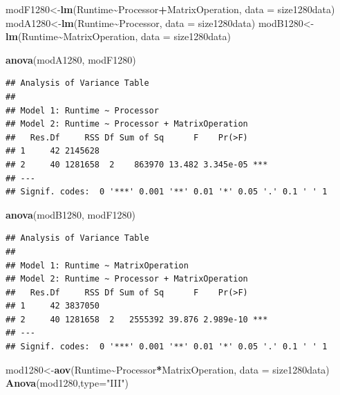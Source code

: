 \documentclass[
]{article}
\newenvironment{Shaded}{\begin{snugshade}}{\end{snugshade}}
\newcommand{\DataTypeTok}[1]{\textcolor[rgb]{0.13,0.29,0.53}{#1}}
\newcommand{\KeywordTok}[1]{\textcolor[rgb]{0.13,0.29,0.53}{\textbf{#1}}}
\newcommand{\NormalTok}[1]{#1}
\newcommand{\OperatorTok}[1]{\textcolor[rgb]{0.81,0.36,0.00}{\textbf{#1}}}
\newcommand{\StringTok}[1]{\textcolor[rgb]{0.31,0.60,0.02}{#1}}
\begin{document}
\begin{Shaded}
\begin{Highlighting}[]
\NormalTok{modF1280\textless{}{-}}\KeywordTok{lm}\NormalTok{(Runtime}\OperatorTok{\textasciitilde{}}\NormalTok{Processor}\OperatorTok{+}\NormalTok{MatrixOperation, }\DataTypeTok{data =}\NormalTok{ size1280data)}
\NormalTok{modA1280\textless{}{-}}\KeywordTok{lm}\NormalTok{(Runtime}\OperatorTok{\textasciitilde{}}\NormalTok{Processor, }\DataTypeTok{data =}\NormalTok{ size1280data)}
\NormalTok{modB1280\textless{}{-}}\KeywordTok{lm}\NormalTok{(Runtime}\OperatorTok{\textasciitilde{}}\NormalTok{MatrixOperation, }\DataTypeTok{data =}\NormalTok{ size1280data)}

\KeywordTok{anova}\NormalTok{(modA1280, modF1280)}
\end{Highlighting}
\end{Shaded}

\begin{verbatim}
## Analysis of Variance Table
## 
## Model 1: Runtime ~ Processor
## Model 2: Runtime ~ Processor + MatrixOperation
##   Res.Df     RSS Df Sum of Sq      F    Pr(>F)    
## 1     42 2145628                                  
## 2     40 1281658  2    863970 13.482 3.345e-05 ***
## ---
## Signif. codes:  0 '***' 0.001 '**' 0.01 '*' 0.05 '.' 0.1 ' ' 1
\end{verbatim}

\begin{Shaded}
\begin{Highlighting}[]
\KeywordTok{anova}\NormalTok{(modB1280, modF1280)}
\end{Highlighting}
\end{Shaded}

\begin{verbatim}
## Analysis of Variance Table
## 
## Model 1: Runtime ~ MatrixOperation
## Model 2: Runtime ~ Processor + MatrixOperation
##   Res.Df     RSS Df Sum of Sq      F    Pr(>F)    
## 1     42 3837050                                  
## 2     40 1281658  2   2555392 39.876 2.989e-10 ***
## ---
## Signif. codes:  0 '***' 0.001 '**' 0.01 '*' 0.05 '.' 0.1 ' ' 1
\end{verbatim}

\begin{Shaded}
\begin{Highlighting}[]
\NormalTok{mod1280\textless{}{-}}\KeywordTok{aov}\NormalTok{(Runtime}\OperatorTok{\textasciitilde{}}\NormalTok{Processor}\OperatorTok{*}\NormalTok{MatrixOperation, }\DataTypeTok{data =}\NormalTok{ size1280data)}
\KeywordTok{Anova}\NormalTok{(mod1280,}\DataTypeTok{type=}\StringTok{"III"}\NormalTok{)}
\end{Highlighting}
\end{Shaded}
\end{document}
